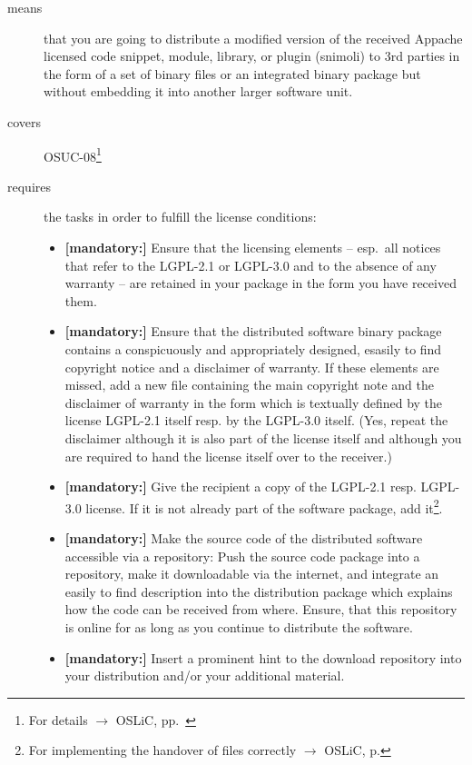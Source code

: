 \begin{description}
\item[means] that you are going to distribute a modified version of the received
Appache licensed code snippet, module, library, or plugin (snimoli) to 3rd
parties in the form of a set of binary files or an integrated binary package but
without embedding it into another larger software unit.
\item[covers] OSUC-08\footnote{For details $\rightarrow$ OSLiC, pp.\ \pageref{OSUC-08-DEF}}
\item[requires] the tasks in order to fulfill the license conditions:
\begin{itemize}

  \item \textbf{[mandatory:]} Ensure that the licensing elements -- esp.\ all
  notices that refer to the LGPL-2.1 or LGPL-3.0 and to the absence of any
  warranty -- are retained in your package in the form you have received them.

  \item \textbf{[mandatory:]} Ensure that the distributed software binary
  package contains a conspicuously and appropriately designed, esasily to find
  copyright notice and a disclaimer of warranty. If these elements are missed,
  add a new file containing the main copyright note and the disclaimer of
  warranty in the form which is textually defined by the license LGPL-2.1 itself
  resp. by the LGPL-3.0 itself. (Yes, repeat the disclaimer although it is also
  part of the license itself and although you are required to hand the license
  itself over to the receiver.)
  
  \item \textbf{[mandatory:]} Give the recipient a copy of the LGPL-2.1 resp.
  LGPL-3.0 license. If it is not already part of the software package, add
  it\footnote{For implementing the handover of files correctly $\rightarrow$
  OSLiC, p. \pageref{DistributingFilesHint}}.

  \item \textbf{[mandatory:]} Make the source code of the distributed software
  accessible via a repository: Push the source code package into a repository,
  make it downloadable via the internet, and integrate an easily to find
  description into the distribution package which explains how the code can be
  received from where. Ensure, that this repository is online for as long as you
  continue to distribute the software.
  
  \item \textbf{[mandatory:]} Insert a prominent hint to the download repository
  into your distribution and/or your additional material.
  

\end{itemize}
\end{description}
